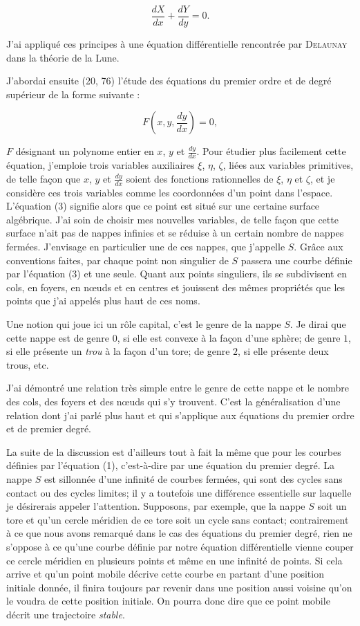 \documentclass[11pt]{article}
\begin{document}
\[
\frac{dX}{dx}+\frac{dY}{dy}=0.
\]

J’ai appliqué ces principes à une équation différentielle rencontrée par \textsc{Delaunay} dans la théorie de la Lune.

J’abordai ensuite (20, 76) l’étude des équations du premier ordre et de degré supérieur de la forme suivante :

\begin{equation*}
F\left(x,y,\frac{dy}{dx}\right)=0,
\tag{3}
\end{equation*}

$F$ désignant un polynome entier en $x$, $y$ et $\frac{dy}{dx}$. Pour étudier plus facilement cette équation, j’emploie trois variables auxiliaires $\xi$, $\eta$, $\zeta$, liées aux variables primitives, de telle façon que $x$, $y$ et $\frac{dy}{dx}$ soient des fonctions rationnelles de $\xi$, $\eta$ et $\zeta$, et je considère ces trois variables comme les coordonnées d’un point dans l’espace. L’équation (3) signifie alors que ce point est situé sur une certaine surface algébrique. J’ai soin de choisir mes nouvelles variables, de telle façon que cette surface n’ait pas de nappes infinies et se réduise à un certain nombre de nappes fermées. J’envisage en particulier une de ces nappes, que j’appelle $S$. Grâce aux conventions faites, par chaque point non singulier de $S$ passera une courbe définie par l’équation (3) et une seule. Quant aux points singuliers, ils se subdivisent en cols, en foyers, en nœuds et en centres et jouissent des mêmes propriétés que les points que j’ai appelés plus haut de ces noms.

Une notion qui joue ici un rôle capital, c’est le genre de la nappe $S$. Je dirai que cette nappe est de genre $0$, si elle est convexe à la façon d’une sphère; de genre $1$, si elle présente un \emph{trou} à la façon d’un tore; de genre $2$, si elle présente deux trous, etc.

J’ai démontré une relation très simple entre le genre de cette nappe et le nombre des cols, des foyers et des nœuds qui s’y trouvent. C’est la généralisation d’une relation dont j’ai parlé plus haut et qui s’applique aux équations du premier ordre et de premier degré.

La suite de la discussion est d’ailleurs tout à fait la même que pour les courbes définies par l’équation (1), c’est-à-dire par une équation du premier degré. La nappe $S$ est sillonnée d’une infinité de courbes fermées, qui sont des cycles sans contact ou des cycles limites; il y a toutefois une différence essentielle sur laquelle je désirerais appeler l’attention. Supposons, par exemple, que la nappe $S$ soit un tore et qu’un cercle méridien de ce tore soit un cycle sans contact; contrairement à ce que nous avons remarqué dans le cas des équations du premier degré, rien ne s’oppose à ce qu’une courbe définie par notre équation différentielle vienne couper ce cercle méridien en plusieurs points et même en une infinité de points. Si cela arrive et qu’un point mobile décrive cette courbe en partant d’une position initiale donnée, il finira toujours par revenir dans une position aussi voisine qu’on le voudra de cette position initiale. On pourra donc dire que ce point mobile décrit une trajectoire \emph{stable}.
\end{document}
